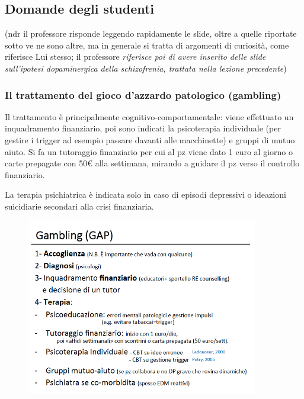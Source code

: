 \subsection{Domande degli studenti}

(ndr il professore risponde leggendo rapidamente le slide, oltre a
quelle riportate sotto ve ne sono altre, ma in generale si tratta di
argomenti di curiosità, come riferisce Lui stesso; il professore
\emph{riferisce poi di avere inserito delle slide sull'ipotesi
dopaminergica della schizofrenia, trattata nella lezione precedente})

\subsubsection{Il trattamento del gioco d'azzardo patologico (gambling)}

Il trattamento è principalmente cognitivo-comportamentale: viene
effettuato un inquadramento finanziario, poi sono indicati la
psicoterapia individuale (per gestire i trigger ad esempio passare
davanti alle macchinette) e gruppi di mutuo aiuto. Si fa un tutoraggio
finanziario per cui al pz viene dato 1 euro al giorno o carte prepagate
con 50\euro{} alla settimana, mirando a guidare il pz verso il controllo
finanziario.

La terapia psichiatrica è indicata solo in caso di episodi depressivi o
ideazioni suicidiarie secondari alla crisi finanziaria.

\begin{figure}[!ht]
\centering
	\includegraphics[width=0.9\textwidth]{017/image20.png}
\end{figure}

